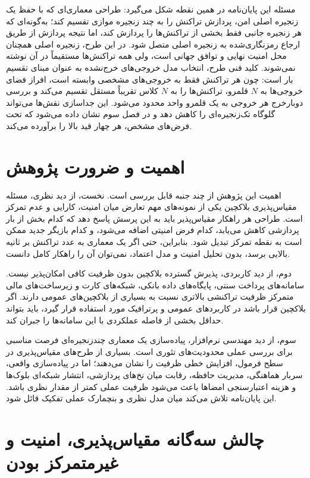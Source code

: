 مسئله این پایان‌نامه در همین نقطه شکل می‌گیرد: طراحی معماری‌ای که با حفظ یک زنجیره اصلی امن، پردازش تراکنش را به چند زنجیره موازی تقسیم کند؛ به‌گونه‌ای که هر زنجیره جانبی فقط بخشی از تراکنش‌ها را پردازش کند، اما نتیجه پردازش از طریق ارجاع رمزنگاری‌شده به زنجیره اصلی متصل شود. در این طرح، زنجیره اصلی همچنان محل امنیت نهایی و توافق جهانی است، ولی همه تراکنش‌ها مستقیماً در آن نوشته نمی‌شوند. کلید فنی طرح، انتخاب مدل خروجی‌های خرج‌نشده به عنوان مبنای تقسیم بار است: چون هر تراکنش فقط به خروجی‌های مشخصی وابسته است، افراز فضای خروجی‌ها به \(N\) قلمرو، تراکنش‌ها را به \(N\) کلاس تقریباً مستقل تقسیم می‌کند و بررسی دوبارخرج هر خروجی به یک قلمرو واحد محدود می‌شود. این جداسازی نقش‌ها می‌تواند گلوگاه تک‌زنجیره‌ای را کاهش دهد و در فصل سوم نشان داده می‌شود که تحت فرض‌های مشخص، هر چهار قید بالا را برآورده می‌کند.

\section{اهمیت و ضرورت پژوهش}

اهمیت این پژوهش از چند جنبه قابل بررسی است. نخست، از دید نظری، مسئله مقیاس‌پذیری بلاکچین یکی از نمونه‌های مهم تعارض میان امنیت، کارایی و عدم تمرکز است. طراحی هر راهکار مقیاس‌پذیر باید به این پرسش پاسخ دهد که کدام بخش از بار پردازشی کاهش می‌یابد، کدام فرض امنیتی اضافه می‌شود، و کدام بازیگر جدید ممکن است به نقطه تمرکز تبدیل شود. بنابراین، حتی اگر یک معماری به عدد تراکنش بر ثانیه بالایی برسد، بدون تحلیل امنیت و مدل اعتماد، نمی‌توان آن را راهکار کامل دانست.

دوم، از دید کاربردی، پذیرش گسترده بلاکچین بدون ظرفیت کافی امکان‌پذیر نیست. سامانه‌های پرداخت سنتی، پایگاه‌های داده بانکی، شبکه‌های کارت و زیرساخت‌های مالی متمرکز ظرفیت تراکنشی بالاتری نسبت به بسیاری از بلاکچین‌های عمومی دارند. اگر بلاکچین قرار باشد در کاربردهای عمومی و پرترافیک مورد استفاده قرار گیرد، باید بتواند حداقل بخشی از فاصله عملکردی با این سامانه‌ها را جبران کند.

سوم، از دید مهندسی نرم‌افزار، پیاده‌سازی یک معماری چندزنجیره‌ای فرصت مناسبی برای بررسی عملی محدودیت‌های تئوری است. بسیاری از طرح‌های مقیاس‌پذیری در سطح فرمول، افزایش خطی ظرفیت را نشان می‌دهند؛ اما در پیاده‌سازی واقعی، سربار هماهنگی، مدیریت حافظه، رقابت میان نخ‌های پردازشی، انتشار شبکه‌ای بلوک‌ها و هزینه اعتبارسنجی امضاها باعث می‌شود ظرفیت عملی کمتر از مقدار نظری باشد. این پایان‌نامه تلاش می‌کند میان مدل نظری و بنچمارک عملی تفکیک قائل شود.

\section{چالش سه‌گانه مقیاس‌پذیری، امنیت و غیرمتمرکز بودن}

